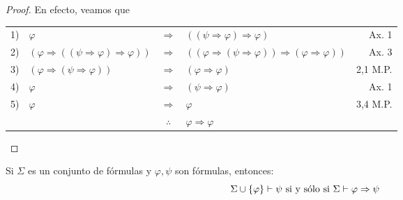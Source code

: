 \documentclass[12pt]{report}
\theoremstyle{largebreak}
\begin{document}
    \begin{proof}
        En efecto, veamos que
        \begin{center}
            \begin{tabular}{r l c l r}
                1) & $\varphi$ & $\Rightarrow$ & $((\psi\Rightarrow\varphi)\Rightarrow\varphi)$ & Ax. 1\\
                2) & $(\varphi\Rightarrow((\psi\Rightarrow\varphi)\Rightarrow\varphi))$ & $\Rightarrow$ & $((\varphi\Rightarrow(\psi\Rightarrow\varphi))\Rightarrow(\varphi\Rightarrow\varphi))$ & Ax. 3\\
                3) & $(\varphi\Rightarrow(\psi\Rightarrow\varphi))$ & $\Rightarrow$ & $(\varphi\Rightarrow\varphi)$ & 2,1 M.P.\\
                4) & $\varphi$ & $\Rightarrow$ & $(\psi\Rightarrow\varphi)$ & Ax. 1\\
                5) & $\varphi$ & $\Rightarrow$ & $\varphi$ & 3,4 M.P.\\
                \hline
                & & $\therefore$ & $\varphi\Rightarrow\varphi$ & \\
            \end{tabular}
        \end{center}
    \end{proof}

    \begin{theor}
        Si $\Sigma$ es un conjunto de fórmulas y $\varphi,\psi$ son fórmulas, entonces:
        \begin{equation*}
            \Sigma\cup\left\{\varphi\right\}\vdash\psi\textup{ si y sólo si }\Sigma\vdash\varphi\Rightarrow\psi
        \end{equation*}
    \end{theor}
\end{document}
